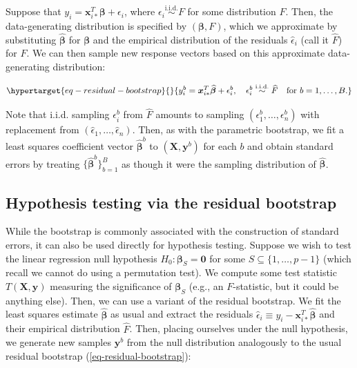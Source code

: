 \documentclass[
  11pt,
  letterpaper,
  oneside]{book}
\theoremstyle{definition}
\theoremstyle{plain}
\theoremstyle{plain}
\theoremstyle{plain}
\theoremstyle{remark}
\begin{document}
Suppose that
\(y_i = \boldsymbol{x}_{i*}^T \boldsymbol{\beta} + \epsilon_i\), where
\(\epsilon_i \overset{\text{i.i.d.}}{\sim} F\) for some distribution
\(F\). Then, the data-generating distribution is specified by
\((\boldsymbol{\beta}, F)\), which we approximate by substituting
\(\boldsymbol{\widehat{\beta}}\) for \(\boldsymbol{\beta}\) and the
empirical distribution of the residuals \(\widehat{\epsilon}_i\) (call
it \(\widehat{F}\)) for \(F\). We can then sample new response vectors
based on this approximate data-generating distribution:

\begin{equation}\protect\hypertarget{eq-residual-bootstrap}{}{
y_i^b = \boldsymbol{x}_{i*}^T \boldsymbol{\widehat{\beta}} + \epsilon_i^b, \quad \epsilon_i^b \overset{\text{i.i.d.}}{\sim} \widehat{F} \quad \text{for } b = 1, \dots, B.
}\label{eq-residual-bootstrap}\end{equation}

Note that i.i.d. sampling \(\epsilon_i^b\) from \(\widehat{F}\) amounts
to sampling \((\epsilon_1^b, \dots, \epsilon_n^b)\) with replacement
from \((\widehat{\epsilon}_1, \dots, \widehat{\epsilon}_n)\). Then, as
with the parametric bootstrap, we fit a least squares coefficient vector
\(\boldsymbol{\widehat{\beta}}^b\) to
\((\boldsymbol{X}, \boldsymbol{y}^b)\) for each \(b\) and obtain
standard errors by treating
\(\{\boldsymbol{\widehat{\beta}}^b\}_{b = 1}^B\) as though it were the
sampling distribution of \(\boldsymbol{\widehat{\beta}}\).

\hypertarget{hypothesis-testing-via-the-residual-bootstrap}{%
\subsection{Hypothesis testing via the residual
bootstrap}\label{hypothesis-testing-via-the-residual-bootstrap}}

While the bootstrap is commonly associated with the construction of
standard errors, it can also be used directly for hypothesis testing.
Suppose we wish to test the linear regression null hypothesis
\(H_0: \boldsymbol{\beta}_S = \boldsymbol{0}\) for some
\(S \subseteq \{1, \dots, p-1\}\) (which recall we cannot do using a
permutation test). We compute some test statistic
\(T(\boldsymbol{X}, \boldsymbol{y})\) measuring the significance of
\(\boldsymbol{\beta}_S\) (e.g., an \(F\)-statistic, but it could be
anything else). Then, we can use a variant of the residual bootstrap. We
fit the least squares estimate \(\boldsymbol{\widehat{\beta}}\) as usual
and extract the residuals
\(\widehat{\epsilon}_i \equiv y_i - \boldsymbol{x}_{i*}^T \boldsymbol{\widehat{\beta}}\)
and their empirical distribution \(\widehat{F}\). Then, placing
ourselves under the null hypothesis, we generate new samples
\(\boldsymbol{y}^b\) from the null distribution analogously to the usual
residual bootstrap (\ref{eq-residual-bootstrap}):
\end{document}
